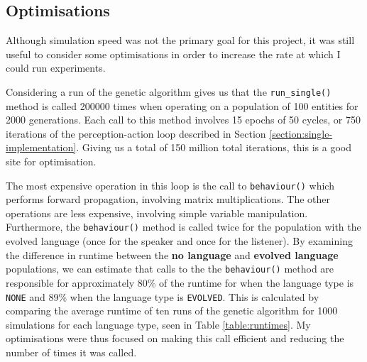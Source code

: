 \documentclass[12pt,a4paper,twoside,openright]{report}
\begin{document}
\subsection{Optimisations}\label{section:optimisations}

Although simulation speed was not the primary goal for this project, it was still useful to consider some optimisations in order to increase the rate at which I could run experiments.


Considering a run of the genetic algorithm gives us that the \texttt{run\_single()} method is called 200000 times when operating on a population of 100 entities for 2000 generations. Each call to this method involves 15 epochs of 50 cycles, or 750 iterations of the perception-action loop described in Section \ref{section:single-implementation}. Giving us a total of 150 million total iterations, this is a good site for optimisation.

The most expensive operation in this loop is the call to \texttt{behaviour()} which performs forward propagation, involving matrix multiplications. The other operations are less expensive, involving simple variable manipulation. Furthermore, the \texttt{behaviour()} method is called twice for the population with the evolved language (once for the speaker and once for the listener). By examining the difference in runtime between the {\bf no language} and {\bf evolved language} populations, we can estimate that calls to the the \texttt{behaviour()} method are responsible for approximately 80\% of the runtime for when the language type is \texttt{NONE} and 89\% when the language type is \texttt{EVOLVED}. This is calculated by comparing the average runtime of ten runs of the genetic algorithm for 1000 simulations for each language type, seen in Table \ref{table:runtimes}. My optimisations were thus focused on making this call efficient and reducing the number of times it was called.
\end{document}
